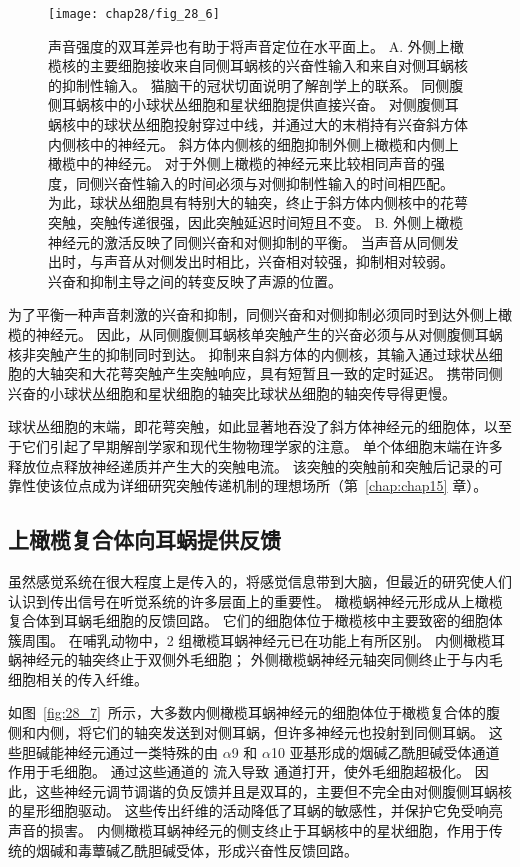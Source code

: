 \begin{figure}[htbp]
	\centering
	\texttt{[image: chap28/fig\_28\_6]}
	\caption{声音强度的双耳差异也有助于将声音定位在水平面上。
		A. 外侧上橄榄核的主要细胞接收来自同侧耳蜗核的兴奋性输入和来自对侧耳蜗核的抑制性输入。
		猫脑干的冠状切面说明了解剖学上的联系。
		同侧腹侧耳蜗核中的小球状丛细胞和星状细胞提供直接兴奋。 
		对侧腹侧耳蜗核中的球状丛细胞投射穿过中线，并通过大的末梢持有兴奋斜方体内侧核中的神经元。
		斜方体内侧核的细胞抑制外侧上橄榄和内侧上橄榄中的神经元。
		对于外侧上橄榄的神经元来比较相同声音的强度，同侧兴奋性输入的时间必须与对侧抑制性输入的时间相匹配。
		为此，球状丛细胞具有特别大的轴突，终止于斜方体内侧核中的花萼突触，突触传递很强，因此突触延迟时间短且不变。
		B. 外侧上橄榄神经元的激活反映了同侧兴奋和对侧抑制的平衡。
		当声音从同侧发出时，与声音从对侧发出时相比，兴奋相对较强，抑制相对较弱。
		兴奋和抑制主导之间的转变反映了声源的位置。}
	\label{fig:28_6}
\end{figure}


为了平衡一种声音刺激的兴奋和抑制，同侧兴奋和对侧抑制必须同时到达外侧上橄榄的神经元。
因此，从同侧腹侧耳蜗核单突触产生的兴奋必须与从对侧腹侧耳蜗核非突触产生的抑制同时到达。
抑制来自斜方体的内侧核，其输入通过球状丛细胞的大轴突和大花萼突触产生突触响应，具有短暂且一致的定时延迟。
携带同侧兴奋的小球状丛细胞和星状细胞的轴突比球状丛细胞的轴突传导得更慢。


球状丛细胞的末端，即花萼突触，如此显著地吞没了斜方体神经元的细胞体，以至于它们引起了早期解剖学家和现代生物物理学家的注意。
单个体细胞末端在许多释放位点释放神经递质并产生大的突触电流。
该突触的突触前和突触后记录的可靠性使该位点成为详细研究突触传递机制的理想场所（第~\ref{chap:chap15} 章）。



\subsection{上橄榄复合体向耳蜗提供反馈}

虽然感觉系统在很大程度上是传入的，将感觉信息带到大脑，但最近的研究使人们认识到传出信号在听觉系统的许多层面上的重要性。
橄榄蜗神经元形成从上橄榄复合体到耳蜗毛细胞的反馈回路。
它们的细胞体位于橄榄核中主要致密的细胞体簇周围。
在哺乳动物中，2 组橄榄耳蜗神经元已在功能上有所区别。
内侧橄榄耳蜗神经元的轴突终止于双侧外毛细胞；
外侧橄榄蜗神经元轴突同侧终止于与内毛细胞相关的传入纤维。


如图~\ref{fig:28_7}~所示，大多数内侧橄榄耳蜗神经元的细胞体位于橄榄复合体的腹侧和内侧，将它们的轴突发送到对侧耳蜗，但许多神经元也投射到同侧耳蜗。
这些胆碱能神经元通过一类特殊的由 $\alpha$9 和 $\alpha$10 亚基形成的烟碱乙酰胆碱受体通道作用于毛细胞。
通过这些通道的  流入导致  通道打开，使外毛细胞超极化。
因此，这些神经元调节调谐的负反馈并且是双耳的，主要但不完全由对侧腹侧耳蜗核的星形细胞驱动。
这些传出纤维的活动降低了耳蜗的敏感性，并保护它免受响亮声音的损害。
内侧橄榄耳蜗神经元的侧支终止于耳蜗核中的星状细胞，作用于传统的烟碱和毒蕈碱乙酰胆碱受体，形成兴奋性反馈回路。


